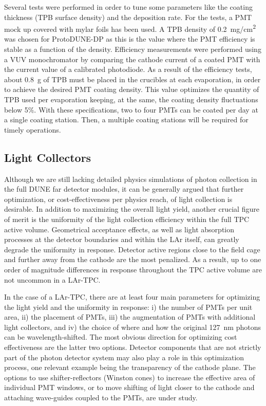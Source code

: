 Several tests were performed in order to tune some parameters like the coating thickness (TPB surface density) and the deposition rate. For the tests, a PMT mock up covered with mylar foils has been used. A TPB density of \SI{0.2}{mg/cm^2} was chosen for ProtoDUNE-DP as this is the value where the PMT efficiency is stable as a function of the density. Efficiency measurements were performed using a VUV monochromator by comparing the cathode current of a coated PMT with the current value of a calibrated photodiode. As a result of the efficiency tests, about \SI{0.8}{g} of TPB must be placed in the crucibles at each evaporation, in order to achieve the desired PMT coating density. %
This value optimizes the quantity of TPB used per evaporation keeping, at the same, the coating density fluctuations below \num{5}$\%$. With these specifications, two to four PMTs can be coated per day at a single coating station. Then, a multiple coating stations will be required for timely operations.

\subsection{Light Collectors}
\label{sec:fddp-pd-2.5}

Although we are still lacking detailed physics simulations of photon collection in the full DUNE far detector modules, it can be generally argued that further optimization, or cost-effectiveness per physics reach, of light collection is desirable. In addition to  maximizing the overall light yield, another crucial figure of merit is the uniformity of the light collection efficiency within the full TPC active volume. Geometrical acceptance effects, as well as light absorption processes at the detector boundaries and within the LAr itself, can greatly degrade the uniformity in response. Detector active regions close to the field cage and further away from the cathode are the most penalized. As a result, up to one order of magnitude differences in response throughout the TPC active volume are not uncommon in a LAr-TPC.

In the case of a LAr-TPC, there are at least four main parameters for optimizing the light yield and the uniformity in response: i) the number of PMTs per unit area, ii) the placement of PMTs, iii) the augmentation of PMTs with additional light collectors, and iv) the choice of where and how the original \SI{127}{nm} photons can be wavelength-shifted. The most obvious direction for optimizing cost effectiveness are the latter two options. Detector components that are not strictly part of the photon detector system may also play a role in this optimization process, one relevant example being the transparency of the cathode plane. The options to use shifter-reflectors (Winston cones) to increase the effective area of individual PMT windows, or to move shifting of light closer to the cathode and attaching wave-guides coupled to the PMTs, are under study.

